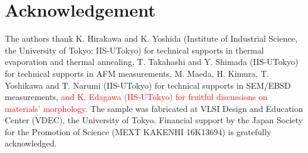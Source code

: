 \documentclass[aip,apl,reprint]{revtex4-1}
\begin{document}
\section*{Acknowledgement}
The authors thank K. Hirakawa and K. Yoshida (Institute of Industrial Science, the University of Tokyo: IIS-UTokyo) for technical supports in thermal evaporation and thermal annealing, T. Takahashi and Y. Shimada (IIS-UTokyo) for technical supports in AFM measurements, M. Maeda, H. Kimura, T. Yoshikawa and T. Narumi (IIS-UTokyo) for technical supports in SEM/EBSD measurements, \textcolor{red}{and K. Edagawa (IIS-UTokyo) for fruitful discussions on materials' morphology.}
The sample was fabricated at VLSI Design and Education Center (VDEC), the University of Tokyo. Financial support by the Japan Society for the Promotion of Science (MEXT KAKENHI 16K13694) is gratefully acknowledged.


\end{document}
